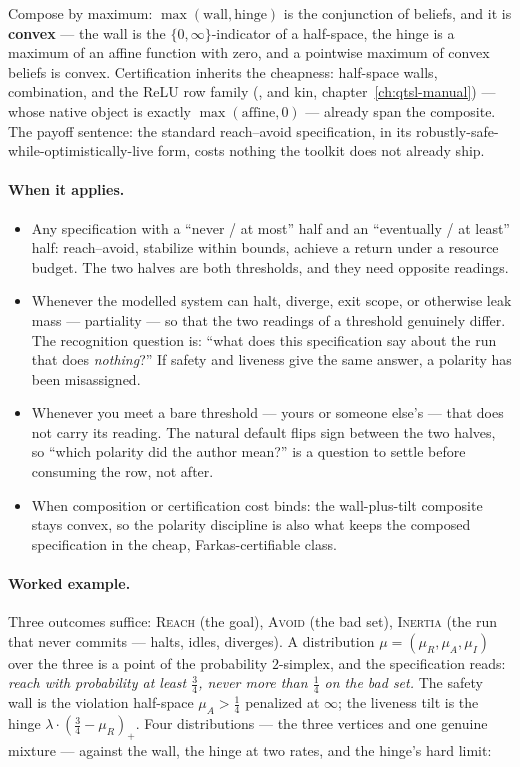 Compose by maximum: $\max(\mathrm{wall}, \mathrm{hinge})$ is the
conjunction of beliefs, and it is \textbf{convex} --- the wall is
the $\{0, \infty\}$-indicator of a half-space, the hinge is a maximum
of an affine function with zero, and a pointwise maximum of convex
beliefs is convex. Certification inherits the cheapness: half-space
walls,  combination, and the ReLU row family
(,  and kin,
chapter~\ref{ch:qtsl-manual}) --- whose native object is exactly
$\max(\mathrm{affine}, 0)$ --- already span the composite. The
payoff sentence: the standard reach--avoid specification, in its
robustly-safe-while-optimistically-live form, costs nothing the
toolkit does not already ship.

\paragraph{When it applies.}
\begin{itemize}
\item Any specification with a ``never / at most'' half and an
  ``eventually / at least'' half: reach--avoid, stabilize within
  bounds, achieve a return under a resource budget. The two halves
  are both thresholds, and they need opposite readings.
\item Whenever the modelled system can halt, diverge, exit scope, or
  otherwise leak mass --- partiality --- so that the two readings of
  a threshold genuinely differ. The recognition question is: ``what
  does this specification say about the run that does
  \emph{nothing}?'' If safety and liveness give the same answer,
  a polarity has been misassigned.
\item Whenever you meet a bare threshold --- yours or someone else's
  --- that does not carry its reading. The natural default flips sign
  between the two halves, so ``which polarity did the author mean?''
  is a question to settle before consuming the row, not after.
\item When composition or certification cost binds: the wall-plus-tilt
  composite stays convex, so the polarity discipline is also what
  keeps the composed specification in the cheap, Farkas-certifiable
  class.
\end{itemize}

\paragraph{Worked example.} Three outcomes suffice: \textsc{Reach}
(the goal), \textsc{Avoid} (the bad set), \textsc{Inertia} (the run
that never commits --- halts, idles, diverges). A distribution
$\mu = (\mu_R, \mu_A, \mu_I)$ over the three is a point of the
probability $2$-simplex, and the specification reads: \emph{reach with
probability at least $\tfrac34$, never more than $\tfrac14$ on the
bad set.} The safety wall is the violation half-space
$\mu_A > \tfrac14$ penalized at $\infty$; the liveness tilt is the
hinge $\lambda \cdot (\tfrac34 - \mu_R)_+$. Four distributions ---
the three vertices and one genuine mixture --- against the wall, the
hinge at two rates, and the hinge's hard limit:

